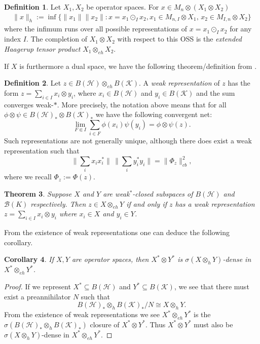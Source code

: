 \documentclass[12pt]{article}
\newtheorem{theorem}{Theorem}[section]
\newtheorem{corollary}[theorem]{Corollary}
\theoremstyle{definition}
\newtheorem{definition}[theorem]{Definition}
\newcommand{\mc}[1]{\mathcal{#1}}
\newcommand{\<}{\langle}
\renewcommand{\>}{\rangle}
\renewcommand{\subset}{\subseteq}
\newcommand{\eh}{\otimes_{eh}}
\newcommand{\h}{\otimes_{h}}
\begin{document}
\begin{definition} \cite[Equation 5.7]{opsp-hopf} \label{defn: eh}
    Let $X_1, X_2$ be operator spaces. For $x \in M_n \otimes (X_1 \otimes X_2)$
    \begin{align*}
        \|x\|_h := \inf \{\|x_1\| \|x_2\| : x = x_1 \odot_I x_2, x_1 \in M_{n,I} \otimes X_1 , \,  x_2 \in M_{I,n} \otimes X_2\}
    \end{align*}
    where the infimum runs over all possible representations of $x = x_1 \odot_I x_2$ for any index $I$. The completion of $X_1 \otimes X_2$ with respect to this OSS is the \textit{extended Haagerup tensor product} $X_1 \eh X_2$.
\end{definition}

If $X$ is furthermore a dual space, we have the following theorem/definition from \cite{blecher-smith-w*h}.
\begin{definition}\cite[Section 2]{blecher-smith-w*h}
    Let $z \in B(\mc H) \otimes_{eh} B(\mc K)$. A \textit{weak representation} of $z$ has the form $z = \sum_{i \in I} x_i \otimes y_i$, where $x_i \in B(\mc H)$ and $y_i \in B(\mc K)$ and the sum converges weak-$*$. More precisely, the notation above means that for all $\phi \otimes \psi \in B(\mc H)_* \otimes B(\mc K)_*$ we have the following convergent net:
    \[
    \lim_{F \Subset I} \sum_{i \in F} \phi(x_i)\psi(y_i) = \phi \otimes \psi (z).
    \]
    Such representations are not generally unique, although there does exist a weak representation such that
    \[
    \bigg\| \sum_i x_i x_i^*\bigg\| \, \bigg\|\sum_i y^*_i y_i \bigg\| = \| \Phi_z\|_{cb}^2,
    \]
    where we recall $\Phi_z := \Phi(z)$.
\end{definition}
\begin{theorem}\cite[Theorem 3.1]{blecher-smith-w*h}
    Suppose $X$ and $Y$ are weak$^*$-closed subspaces of $B(\mc H)$ and $\mc B(K)$ respectively. Then $z \in X \otimes_{eh} Y$ if and only if $z$ has a weak representation $z = \sum_{i \in I} x_i \otimes y_i$ where $x_i \in X$ and $y_i \in Y$.
\end{theorem}

From the existence of weak representations one can deduce the following corollary.

\begin{corollary} \label{cor: alg-eh-density}
    If $X, Y$ are operator spaces, then $X^* \otimes Y^*$ is $\sigma(X \h Y)$-dense in $X^* \eh Y^*$.
\end{corollary}
\begin{proof}
    If we represent $X^* \subset B(\mc H)$ and $Y^* \subset B(\mc K)$, we see that there must exist a preannihilator $N$ such that
    \[
    B(\mc H)_* \h B(\mc K)_* / N \cong X \h Y.
    \]
    From the existence of weak representations we see $X^* \eh Y^*$ is the $\sigma(B(\mc H)_* \h B(\mc K)_*)$ closure of $X^* \otimes Y^*$. Thus $X^* \otimes Y^*$ must also be $\sigma(X \h Y)$-dense in $X^* \eh Y^*$.
\end{proof}
\end{document}
